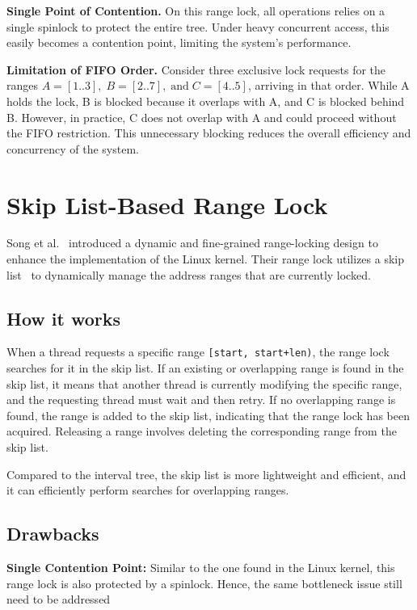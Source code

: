 \textbf{Single Point of Contention.}
On this range lock, all operations relies on a single spinlock to protect the entire tree. Under heavy concurrent access, this easily becomes a contention point, limiting the system's performance.
    
\textbf{Limitation of FIFO Order.} 
Consider three exclusive lock requests for the ranges \( A = [1..3], \; B = [2..7], \; \text{and} \; C = [4..5] \), arriving in that order. While A holds the lock, B is blocked because it overlaps with A, and C is blocked behind B. However, in practice, C does not overlap with A and could proceed without the FIFO restriction. This unnecessary blocking reduces the overall efficiency and concurrency of the system.

\section{Skip List-Based Range Lock}

Song et al.~\parencite{song2013parallelizing} introduced a dynamic and fine-grained range-locking design to enhance the implementation of the Linux kernel. Their range lock utilizes a skip list~\parencite{pugh1990skip} to dynamically manage the address ranges that are currently locked.

\subsection*{How it works}

When a thread requests a specific range \texttt{[start, start+len)}, the range lock searches for it in the skip list. If an existing or overlapping range is found in the skip list, it means that another thread is currently modifying the specific range, and the requesting thread must wait and then retry. If no overlapping range is found, the range is added to the skip list, indicating that the range lock has been acquired. Releasing a range involves deleting the corresponding range from the skip list.

Compared to the interval tree, the skip list is more lightweight and efficient, and it can efficiently perform searches for overlapping ranges.

\subsection*{Drawbacks}

\textbf{Single Contention Point:} 
Similar to the one found in the Linux kernel, this range lock is also protected by a spinlock. Hence, the same bottleneck issue still need to be addressed  

